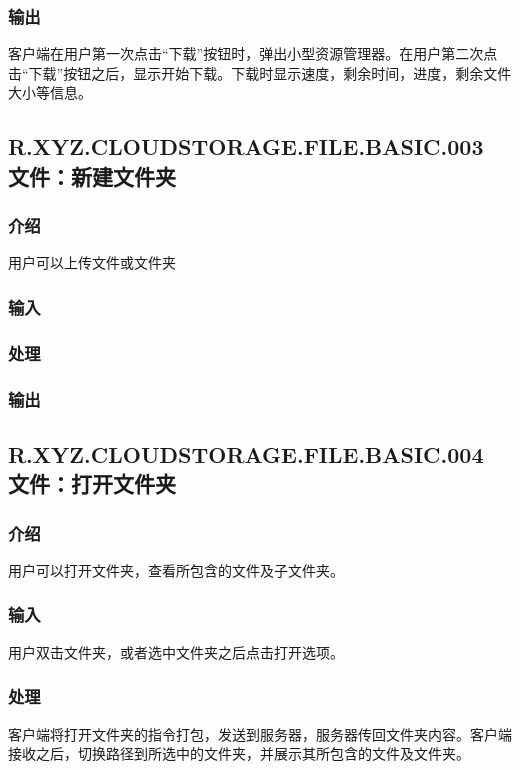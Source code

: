 \subsubsection{输出}
客户端在用户第一次点击“下载”按钮时，弹出小型资源管理器。在用户第二次点击“下载”按钮之后，显示开始下载。下载时显示速度，剩余时间，进度，剩余文件大小等信息。


\subsection{R.XYZ.CLOUDSTORAGE.FILE.BASIC.003 文件：新建文件夹}

\subsubsection{介绍}
用户可以上传文件或文件夹

\subsubsection{输入}

\subsubsection{处理}

\subsubsection{输出}

\subsection{R.XYZ.CLOUDSTORAGE.FILE.BASIC.004 文件：打开文件夹}

\subsubsection{介绍}
用户可以打开文件夹，查看所包含的文件及子文件夹。

\subsubsection{输入}
用户双击文件夹，或者选中文件夹之后点击打开选项。

\subsubsection{处理}
客户端将打开文件夹的指令打包，发送到服务器，服务器传回文件夹内容。客户端接收之后，切换路径到所选中的文件夹，并展示其所包含的文件及文件夹。

